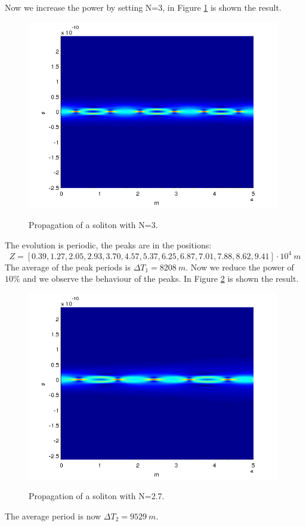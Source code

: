 \documentclass[a4paper,10pt]{report}
\begin{document}
Now we increase the power by setting N=3, in Figure \ref{es5_N3} is shown the result.
\begin{figure}[!ht]
  \centering
  \includegraphics[width=11cm]{es5_N3.png}\\
  \caption{Propagation of a soliton with N=3.}
  \label{es5_N3}
\end{figure}

The evolution is periodic, the peaks are in the positions:
$$Z=[0.39,   1.27,  2.05,   2.93,  3.70,   4.57,   5.37,   6.25, 6.87, 7.01,  7.88, 8.62, 9.41]\cdot 10^4 \ m$$
The average of the peak periods is $\Delta T_1=8208 \ m$.
Now we reduce the power of $10 \%$ and we observe the behaviour of the peaks. In Figure \ref{es5_N27} is shown the result.
\begin{figure}[!ht]
  \centering
  \includegraphics[width=11cm]{es5_N27.png}\\
  \caption{Propagation of a soliton with N=2.7.}
  \label{es5_N27}
\end{figure}
The average period is now $\Delta T_2=9529 \ m$.
\end{document}
